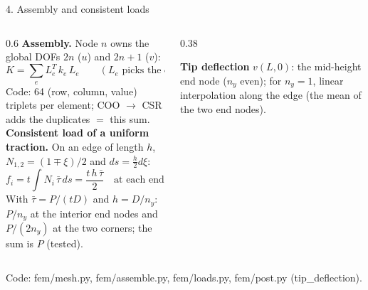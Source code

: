 \documentclass[aspectratio=169,10pt]{beamer}
\newcommand{\src}[1]{{\color{muted}\scriptsize #1}}
\begin{document}
\begin{frame}{4. Assembly and consistent loads}
  \begin{columns}[T]
    \begin{column}{0.6\textwidth}
      \textbf{Assembly.} Node $n$ owns the global DOFs $2n$ ($u$) and $2n+1$ ($v$):
      \[
        K=\sum_e L_e^T\,k_e\,L_e\qquad(L_e\text{ picks the element's 8 DOFs})
      \]
      Code: 64 (row, column, value) triplets per element; COO $\to$ CSR adds the duplicates $=$ this sum.\\[5pt]
      \textbf{Consistent load of a uniform traction.} On an edge of length $h$,
      $N_{1,2}=(1\mp\xi)/2$ and $ds=\frac h2d\xi$:
      \[
        f_i=t\int N_i\,\bar\tau\,ds=\frac{t\,h\,\bar\tau}{2}\quad\text{at each end of the edge}
      \]
      With $\bar\tau=P/(tD)$ and $h=D/n_y$: $P/n_y$ at the interior end nodes and $P/(2n_y)$ at the
      two corners; the sum is $P$ (tested).
    \end{column}
    \begin{column}{0.38\textwidth}
      \centering

      \vspace{0.4em}
      \small\raggedright
      \textbf{Tip deflection} $v(L,0)$: the mid-height end node ($n_y$ even); for $n_y=1$, linear
      interpolation along the edge (the mean of the two end nodes).
    \end{column}
  \end{columns}
  \vfill
  \src{Code: fem/mesh.py, fem/assemble.py, fem/loads.py, fem/post.py (tip\_deflection).}
\end{frame}
\end{document}
